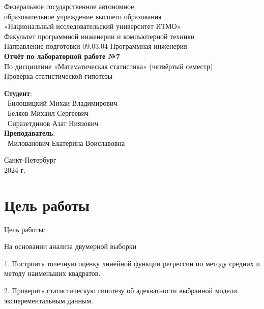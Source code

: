 \documentclass{article}
\begin{document}
\begin{center}
    \Large
    Федеральное государственное автономное \\
    образовательное учреждение высшего образования \\ 
    «Национальный исследовательский университет ИТМО»\\
    \vspace{0.5cm}
    \large
    Факультет программной инженерии и компьютерной техники \\
    Направление подготовки 09.03.04 Программная инженерия \\
    \vspace{1cm}
    \Large
    \textbf{Отчёт по лабораторной работе №7} \\
    По дисциплине «Математическая статистика» (четвёртый семестр)\\
    Проверка статистической гипотезы\\
    \large
    \vspace{8cm}

    \begin{minipage}{.33\textwidth}
    \end{minipage}
    \hfill
    \begin{minipage}{.4\textwidth}
    
        \textbf{Студент}: \vspace{.1cm} \\
        \ Билошицкий Михаи Владимирович\\
        \ Беляев Михаил Сергеевич\\
        \ Сиразетдинов Азат Ниязович\\
        \textbf{Преподаватель}:  \\
        \ Милованович Екатерина Воиславовна
    \end{minipage}
    \vfill
Санкт-Петербург\\ 2024 г.
\end{center}
\thispagestyle{empty}

\newpage
\section*{Цель работы}
Цель работы:

На основании анализа двумерной выборки

1. Построить точечную оценку линейной функции регрессии по методу средних и методу наименьших квадратов.

2. Проверить статистическую гипотезу об адекватности выбранной модели эксперементальным данным.
\end{document}
